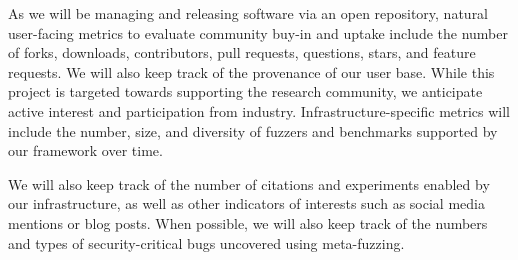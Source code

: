
As we will be managing and releasing software via an open repository, 
natural user-facing metrics to evaluate community buy-in and uptake include the number of forks, downloads, contributors, pull requests, questions, 
stars, and feature requests. 
We will also keep track of the provenance of our user base. While this project is targeted towards supporting the research community, 
we anticipate active interest and participation from industry. 
Infrastructure-specific metrics will include the number, size, and diversity of fuzzers and benchmarks supported by our framework over time.

We will also keep track of the number of citations and experiments enabled by our infrastructure, as well 
as other indicators of interests such as social media mentions or blog posts.
When possible, we will also keep track of the numbers and types of security-critical bugs uncovered using meta-fuzzing.

